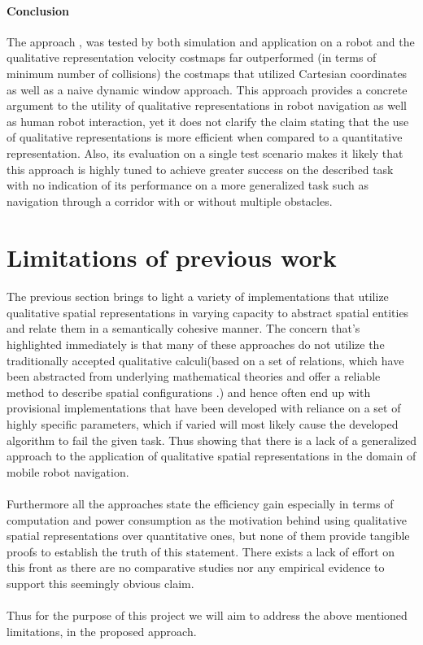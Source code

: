 	
	\paragraph{Conclusion}The approach \cite{dondrup2016qualitative}, was tested by both simulation and application on a robot and the qualitative representation velocity costmaps far outperformed (in terms of minimum number of collisions) the costmaps that utilized Cartesian coordinates as well as a naive dynamic window approach. This approach provides a concrete argument to the utility of qualitative representations in robot navigation as well as human robot interaction, yet it does not clarify the claim stating that the use of qualitative representations is more efficient when compared to a quantitative representation. Also, its evaluation on a single test scenario makes it likely that this approach is highly tuned to achieve greater success on the described task with no indication of its performance on a more generalized task such as navigation through a corridor with or without multiple obstacles.


\section{Limitations of previous work}
\paragraph{} The previous section brings to light a variety of implementations that utilize qualitative spatial representations in varying capacity to abstract spatial entities and relate them in a semantically cohesive manner. The concern that's highlighted immediately is that many of these approaches do not utilize the traditionally accepted qualitative calculi(based on a set of relations, which have been abstracted from underlying mathematical theories and offer a reliable method to describe spatial configurations \cite{lucke2011streets}.) and hence often end up with provisional implementations that have been developed with reliance on a set of highly specific parameters, which if varied will most likely cause the developed algorithm to fail the given task. Thus showing that there is a lack of a generalized approach to the application of qualitative spatial representations in the domain of mobile robot navigation.

\paragraph{} Furthermore all the approaches state the efficiency gain especially in terms of computation and power consumption as the motivation behind using qualitative spatial representations over quantitative ones, but none of them provide tangible proofs to establish the truth of this statement. There exists a lack of effort on this front as there are no comparative studies nor any empirical evidence to support this seemingly obvious claim. 

\paragraph{} Thus for the purpose of this project we will aim to address the above mentioned limitations, in the proposed approach.
